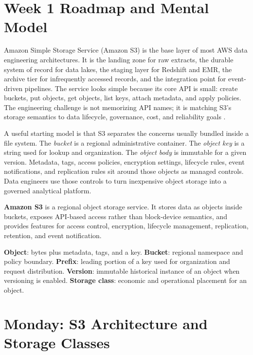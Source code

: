 \section{Week 1 Roadmap and Mental Model}
Amazon Simple Storage Service (Amazon S3) is the base layer of most AWS data engineering architectures. It is the landing zone for raw extracts, the durable system of record for data lakes, the staging layer for Redshift and EMR, the archive tier for infrequently accessed records, and the integration point for event-driven pipelines. The service looks simple because its core API is small: create buckets, put objects, get objects, list keys, attach metadata, and apply policies. The engineering challenge is not memorizing API names; it is matching S3's storage semantics to data lifecycle, governance, cost, and reliability goals \cite{awsS3UserGuide,awsWellArchitectedAnalytics}.

A useful starting model is that S3 separates the concerns usually bundled inside a file system. The \emph{bucket} is a regional administrative container. The \emph{object key} is a string used for lookup and organization. The \emph{object body} is immutable for a given version. Metadata, tags, access policies, encryption settings, lifecycle rules, event notifications, and replication rules sit around those objects as managed controls. Data engineers use those controls to turn inexpensive object storage into a governed analytical platform.

\begin{definitionbox}
\textbf{Amazon S3} is a regional object storage service. It stores data as objects inside buckets, exposes API-based access rather than block-device semantics, and provides features for access control, encryption, lifecycle management, replication, retention, and event notification.
\end{definitionbox}

\begin{keyterms}
\textbf{Object}: bytes plus metadata, tags, and a key. \textbf{Bucket}: regional namespace and policy boundary. \textbf{Prefix}: leading portion of a key used for organization and request distribution. \textbf{Version}: immutable historical instance of an object when versioning is enabled. \textbf{Storage class}: economic and operational placement for an object.
\end{keyterms}

\section{Monday: S3 Architecture and Storage Classes}
